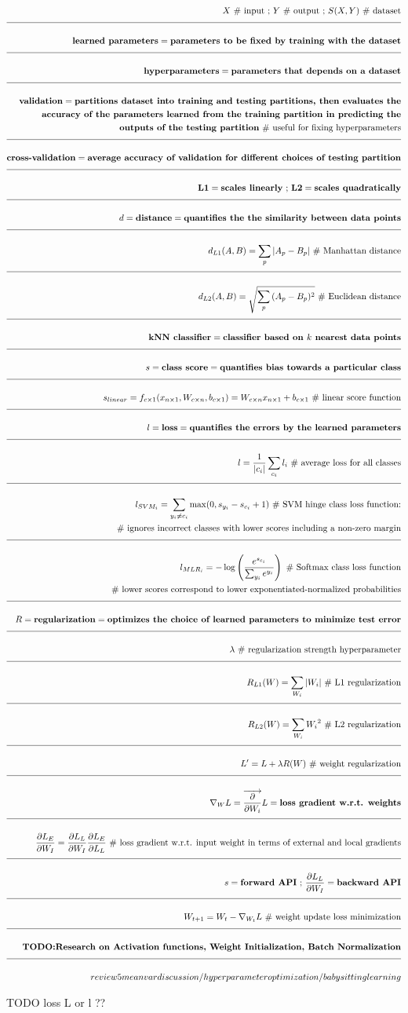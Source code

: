 \documentclass[a4paper]{article}
\newcommand{\eqComment}[1]{\text{  \# #1}}
\newcommand{\eqSep}{\text{ ;  }}
\newcommand{\n}{\\[1.5ex] \hline \nonumber \\[0ex]}
\newcommand{\m}{\nonumber \\}
\begin{document}
\begin{tcolorbox}
\begin{align}
   X \eqComment{input} \eqSep Y \eqComment{output} \eqSep S(X, Y) \eqComment{dataset}
\n \textbf{learned parameters} = \textbf{parameters to be fixed by training with the dataset}
\n \textbf{hyperparameters} = \textbf{parameters that depends on a dataset}
\n \textbf{validation} = \textbf{partitions dataset into training and testing partitions, then evaluates the}
\m \textbf{accuracy of the parameters learned from the training partition in predicting the}
\m \textbf{outputs of the testing partition} \eqComment{useful for fixing hyperparameters}
\n \textbf{cross-validation} = \textbf{average accuracy of validation for different choices of testing partition}
\n \textbf{L1} = \textbf{scales linearly} \eqSep \textbf{L2} = \textbf{scales quadratically}
\n d = \textbf{distance} = \textbf{quantifies the the similarity between data points}
\n d_{L1}(A, B) = \sum_p{|A_p - B_p|} \eqComment{Manhattan distance}
\n d_{L2}(A, B) = \sqrt{\sum_p{(A_p - B_p)^2}} \eqComment{Euclidean distance}
\n \textbf{kNN classifier} = \textbf{classifier based on $k$ nearest data points} 
\n s = \textbf{class score} = \textbf{quantifies bias towards a particular class}
\n s_{linear} = f_{c \times 1}(x_{n \times 1}, W_{c \times n}, b_{c \times 1}) = W_{c \times n} x_{n \times 1} + b_{c \times 1} \eqComment{linear score function}
\n l = \textbf{loss} = \textbf{quantifies the errors by the learned parameters}
\n l = \frac{1}{|c_i|} \sum_{c_i} l_i \eqComment{average loss for all classes}
\n l_{SVM_i} =  \sum_{y_i \neq c_i} \max(0, s_{y_i} - s_{c_i} + 1) \eqComment{SVM hinge class loss function:}
\m \eqComment{ignores incorrect classes with lower scores including a non-zero margin}
\n l_{MLR_i} = -\log\left(\frac{e^{s_{c_i}}}{\sum_{y_i} e^{y_i}}\right) \eqComment{Softmax class loss function}
\m \eqComment{lower scores correspond to lower exponentiated-normalized probabilities}
\n R = \textbf{regularization} = \textbf{optimizes the choice of learned parameters to minimize test error}
\n \lambda \eqComment{regularization strength hyperparameter}
\n R_{L1}(W) = \sum_{W_i} |W_i| \eqComment{L1 regularization}
\n R_{L2}(W) = \sum_{W_i} {W_i}^2 \eqComment{L2 regularization}
\n L^\prime = L + \lambda R(W) \eqComment{weight regularization}
\n \nabla_W L = \overrightarrow{\frac{\partial}{\partial W_i}} L = \textbf{loss gradient w.r.t. weights}
\n \frac{\partial L_E}{\partial W_I} = \frac{\partial L_L}{\partial W_I} \frac{\partial L_E}{\partial L_L} \eqComment{loss gradient w.r.t. input weight in terms of external and local gradients}
\n s = \textbf{forward API} \eqSep \frac{\partial L_L}{\partial W_I} = \textbf{backward API}
\n W_{t+1} = W_{t} - \nabla_{W_t} L \eqComment{weight update loss minimization}
\n \textbf{TODO:Research on Activation functions, Weight Initialization, Batch Normalization}
\n review 5 mean var discussion / hyperparameter optimization / babysitting learning
\end{align}
\end{tcolorbox}
TODO loss L or l ??
\end{document}
